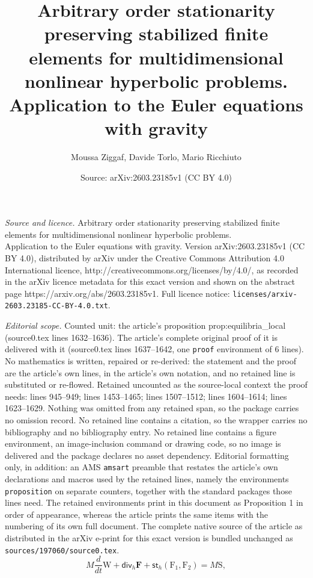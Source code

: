 \documentclass[10pt,a4paper]{amsart}
\title{Arbitrary order stationarity preserving stabilized finite elements for multidimensional nonlinear hyperbolic problems. \\ Application to the Euler equations with gravity}
\author{Moussa Ziggaf, Davide Torlo, Mario Ricchiuto}
\date{Source: arXiv:2603.23185v1 (CC BY 4.0)}
\begin{document}
\maketitle

\noindent\emph{Source and licence.} Arbitrary order stationarity preserving stabilized finite elements for multidimensional nonlinear hyperbolic problems. \\ Application to the Euler equations with gravity. Version arXiv:2603.23185v1 (CC BY 4.0), distributed by arXiv under the Creative Commons Attribution 4.0 International licence, http://creativecommons.org/licenses/by/4.0/, as recorded in the arXiv licence metadata for this exact version and shown on the abstract page https://arxiv.org/abs/2603.23185v1. Full licence notice: \texttt{licenses/arxiv-2603.23185-CC-BY-4.0.txt}.\par\smallskip

\noindent\textit{Editorial scope.} Counted unit: the article's proposition prop:equilibria\_local (source0.tex lines 1632--1636). The article's complete original proof of it is delivered with it (source0.tex lines 1637--1642, one \texttt{proof} environment of 6 lines). No mathematics is written, repaired or re-derived: the statement and the proof are the article's own lines, in the article's own notation, and no retained line is substituted or re-flowed.  Retained uncounted as the source-local context the proof needs: lines 945--949; lines 1453--1465; lines 1507--1512; lines 1604--1614; lines 1623--1629.  Nothing was omitted from any retained span, so the package carries no omission record.  No retained line contains a citation, so the wrapper carries no bibliography and no bibliography entry.  No retained line contains a figure environment, an image-inclusion command or drawing code, so no image is delivered and the package declares no asset dependency.  Editorial formatting only, in addition: an AMS \texttt{amsart} preamble that restates the article's own declarations and macros used by the retained lines, namely the environments \texttt{proposition} on separate counters, together with the standard packages those lines need.  The retained environments print in this document as Proposition 1 in order of appearance, whereas the article prints the same items with the numbering of its own full document.  The complete native source of the article as distributed in the arXiv e-print for this exact version is bundled unchanged as \texttt{sources/197060/source0.tex}.
\begin{equation}\label{eq:weakG1-SU}
M \dfrac{d }{dt} \mathrm{W} +
 \textsf{div}_h \mathbf{F}    + \mathsf{st}_h(\mathrm{F}_1,\mathrm{F}_2)=
M  \mathrm{S},
\end{equation}
\end{document}
